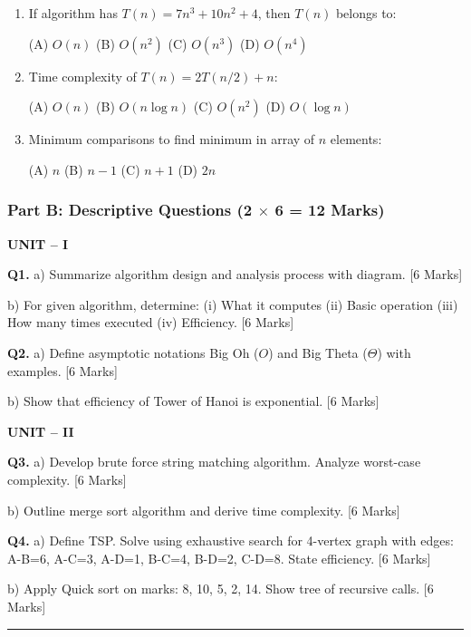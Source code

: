 \documentclass[11pt,a4paper]{article}
\begin{document}
\begin{enumerate}
\item If algorithm has $T(n) = 7n^3 + 10n^2 + 4$, then $T(n)$ belongs to:

(A) $O(n)$ \quad (B) $O(n^2)$ \quad (C) $O(n^3)$ \quad (D) $O(n^4)$

\item Time complexity of $T(n) = 2T(n/2) + n$:

(A) $O(n)$ \quad (B) $O(n \log n)$ \quad (C) $O(n^2)$ \quad (D) $O(\log n)$

\item Minimum comparisons to find minimum in array of $n$ elements:

(A) $n$ \quad (B) $n - 1$ \quad (C) $n + 1$ \quad (D) $2n$
\end{enumerate}

\subsubsection*{Part B: Descriptive Questions (2 $\times$ 6 = 12 Marks)}

\textbf{UNIT -- I}

\textbf{Q1.} a) Summarize algorithm design and analysis process with diagram. \hfill [6 Marks]

b) For given algorithm, determine: (i) What it computes (ii) Basic operation (iii) How many times executed (iv) Efficiency. \hfill [6 Marks]

\textbf{Q2.} a) Define asymptotic notations Big Oh ($O$) and Big Theta ($\Theta$) with examples. \hfill [6 Marks]

b) Show that efficiency of Tower of Hanoi is exponential. \hfill [6 Marks]

\textbf{UNIT -- II}

\textbf{Q3.} a) Develop brute force string matching algorithm. Analyze worst-case complexity. \hfill [6 Marks]

b) Outline merge sort algorithm and derive time complexity. \hfill [6 Marks]

\textbf{Q4.} a) Define TSP. Solve using exhaustive search for 4-vertex graph with edges: A-B=6, A-C=3, A-D=1, B-C=4, B-D=2, C-D=8. State efficiency. \hfill [6 Marks]

b) Apply Quick sort on marks: 8, 10, 5, 2, 14. Show tree of recursive calls. \hfill [6 Marks]

\vspace{0.5cm}
\hrule
\vspace{0.5cm}
\end{document}
